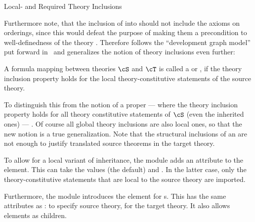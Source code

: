 \begin{omgroup}[id=complex-theories,short=Complex Theories,
                            creators=miko,contributors=frabe]
\begin{omgroup}[id=restricting-inference,short=Local/Required Theory Inclusions]{Local- and
  Required Theory Inclusions}
\begin{module}[id=restinf]
Furthermore note, that the inclusion of {} into {}
should not include the {} axioms on orderings, since this would defeat the
purpose of making them a precondition to well-definedness of the theory
{}. Therefore {\omdoc} follows the ``development graph model'' put
forward in~\cite{Hutter:mocsv00} and generalizes the notion of theory inclusions even
further:
\begin{definition}[display=flow,id=local.theory.inclusion]
  A formula mapping between theories $\cS$ and $\cT$ is called a
  {} or {}, if the theory
  inclusion property holds for the local theory-constitutive statements of the source
  theory.
\end{definition}
\begin{omtext}
  To distinguish this from the notion of a proper {} --- where
  the theory inclusion property holds for all theory constitutive statements of $\cS$
  (even the inherited ones) --- . Of
  course all global theory inclusions are also local ones, so that the new notion is a
  true generalization. Note that the structural inclusions of an
  {} are not enough to justify translated source theorems in the
  target theory.
\end{omtext}

\begin{omtext}
  To allow for a local variant of inheritance, the {} module adds an
  attribute {} to the {} element. This can take
  the values {} (the default) and
  {}. In the latter case, only the theory-constitutive
  statements that are local to the source theory are imported.
\end{omtext}

\begin{definition}[id=axiom-inclusion.def]
  Furthermore, the {} module introduces the {}
  element for {s}. This has the same attributes as
  {}: {} to specify source
  theory, {} for the target theory. It also allows
  {} elements as children.
\end{definition}
\end{module}
\end{omgroup}



\end{omgroup}
